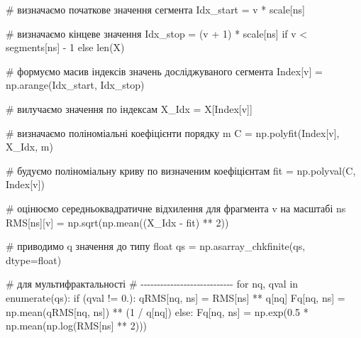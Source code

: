 \documentclass[
  letterpaper,
]{report}
\newenvironment{Shaded}{\begin{snugshade}}{\end{snugshade}}
\newcommand{\BuiltInTok}[1]{\textcolor[rgb]{0.00,0.23,0.31}{#1}}
\newcommand{\CommentTok}[1]{\textcolor[rgb]{0.37,0.37,0.37}{#1}}
\newcommand{\ControlFlowTok}[1]{\textcolor[rgb]{0.00,0.23,0.31}{#1}}
\newcommand{\DecValTok}[1]{\textcolor[rgb]{0.68,0.00,0.00}{#1}}
\newcommand{\FloatTok}[1]{\textcolor[rgb]{0.68,0.00,0.00}{#1}}
\newcommand{\KeywordTok}[1]{\textcolor[rgb]{0.00,0.23,0.31}{#1}}
\newcommand{\NormalTok}[1]{\textcolor[rgb]{0.00,0.23,0.31}{#1}}
\newcommand{\OperatorTok}[1]{\textcolor[rgb]{0.37,0.37,0.37}{#1}}
\begin{document}
\begin{Shaded}
\begin{Highlighting}[]
            \CommentTok{\# визначаємо початкове значення сегмента}
\NormalTok{            Idx\_start }\OperatorTok{=}\NormalTok{ v }\OperatorTok{*}\NormalTok{ scale[ns]  }
                       
            \CommentTok{\# визначаємо кінцеве значення}
\NormalTok{            Idx\_stop }\OperatorTok{=}\NormalTok{ (v }\OperatorTok{+} \DecValTok{1}\NormalTok{) }\OperatorTok{*}\NormalTok{ scale[ns] }\ControlFlowTok{if}\NormalTok{ v }\OperatorTok{\textless{}}\NormalTok{ segments[ns] }\OperatorTok{{-}} \DecValTok{1} \ControlFlowTok{else} \BuiltInTok{len}\NormalTok{(X)    }
            
            \CommentTok{\# формуємо масив індексів значень досліджуваного сегмента}
\NormalTok{            Index[v] }\OperatorTok{=}\NormalTok{ np.arange(Idx\_start, Idx\_stop)  }

            \CommentTok{\# вилучаємо значення по індексам}
\NormalTok{            X\_Idx }\OperatorTok{=}\NormalTok{ X[Index[v]]                       }

            \CommentTok{\# визначаємо поліноміальні коефіцієнти порядку m}
\NormalTok{            C }\OperatorTok{=}\NormalTok{ np.polyfit(Index[v], X\_Idx, m) }
            
            \CommentTok{\# будуємо поліноміальну криву по визначеним коефіцієнтам}
\NormalTok{            fit }\OperatorTok{=}\NormalTok{ np.polyval(C, Index[v])  }

            \CommentTok{\# оцінюємо середньоквадратичне відхилення для фрагмента v на масштабі ns }
\NormalTok{            RMS[ns][v] }\OperatorTok{=}\NormalTok{ np.sqrt(np.mean((X\_Idx }\OperatorTok{{-}}\NormalTok{ fit) }\OperatorTok{**} \DecValTok{2}\NormalTok{)) }
        
        \CommentTok{\# приводимо q значення до типу float}
\NormalTok{        qs }\OperatorTok{=}\NormalTok{ np.asarray\_chkfinite(qs, dtype}\OperatorTok{=}\BuiltInTok{float}\NormalTok{)}

        \CommentTok{\# для мультифрактальності}
        \CommentTok{\# {-}{-}{-}{-}{-}{-}{-}{-}{-}{-}{-}{-}{-}{-}{-}{-}{-}{-}{-}{-}{-}{-}{-}{-}{-}{-}{-}{-}}
        \ControlFlowTok{for}\NormalTok{ nq, qval }\KeywordTok{in} \BuiltInTok{enumerate}\NormalTok{(qs):}
            \ControlFlowTok{if}\NormalTok{ (qval }\OperatorTok{!=} \FloatTok{0.}\NormalTok{): }
\NormalTok{                qRMS[nq, ns] }\OperatorTok{=}\NormalTok{ RMS[ns] }\OperatorTok{**}\NormalTok{ q[nq]}
\NormalTok{                Fq[nq, ns] }\OperatorTok{=}\NormalTok{ np.mean(qRMS[nq, ns]) }\OperatorTok{**}\NormalTok{ (}\DecValTok{1} \OperatorTok{/}\NormalTok{ q[nq])}
            \ControlFlowTok{else}\NormalTok{:}
\NormalTok{                Fq[nq, ns] }\OperatorTok{=}\NormalTok{ np.exp(}\FloatTok{0.5} \OperatorTok{*}\NormalTok{ np.mean(np.log(RMS[ns] }\OperatorTok{**} \DecValTok{2}\NormalTok{)))}


\end{Highlighting}
\end{Shaded}
\end{document}
